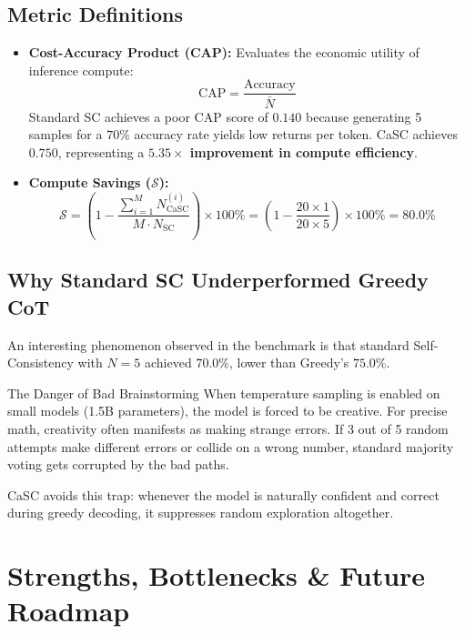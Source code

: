 \documentclass[11pt,a4paper]{article}
\begin{document}
\subsection{Metric Definitions}
\begin{itemize}[leftmargin=*]
    \item \textbf{Cost-Accuracy Product (CAP):} Evaluates the economic utility of inference compute:
    \begin{equation}
        \text{CAP} = \frac{\text{Accuracy}}{\bar{N}}
    \end{equation}
    Standard SC achieves a poor CAP score of $0.140$ because generating 5 samples for a $70\%$ accuracy rate yields low returns per token. CaSC achieves $0.750$, representing a \textbf{$5.35\times$ improvement in compute efficiency}.
    \item \textbf{Compute Savings ($\mathcal{S}$):}
    \begin{equation}
        \mathcal{S} = \left( 1 - \frac{\sum_{i=1}^M N_{\text{CaSC}}^{(i)}}{M \cdot N_{\text{SC}}} \right) \times 100\% = \left( 1 - \frac{20 \times 1}{20 \times 5} \right) \times 100\% = 80.0\%
    \end{equation}
\end{itemize}

\subsection{Why Standard SC Underperformed Greedy CoT}
An interesting phenomenon observed in the benchmark is that standard Self-Consistency with $N=5$ achieved $70.0\%$, lower than Greedy's $75.0\%$. 
\begin{laymanbox}{The Danger of Bad Brainstorming}
When temperature sampling is enabled on small models (1.5B parameters), the model is forced to be creative. For precise math, creativity often manifests as making strange errors. If 3 out of 5 random attempts make different errors or collide on a wrong number, standard majority voting gets corrupted by the bad paths. 

CaSC avoids this trap: whenever the model is naturally confident and correct during greedy decoding, it suppresses random exploration altogether.
\end{laymanbox}

\section{Strengths, Bottlenecks \& Future Roadmap}
\end{document}
